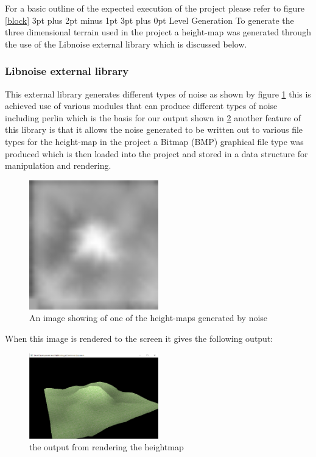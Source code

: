 \documentclass[12pt,a4paper]{article}
\makeatletter
\renewcommand\subsection{\@startsection {subsection}{1}{2mm} %
                               {3pt plus 2pt minus 1pt} %
                               {3pt plus 0pt} %
                               {\normalfont\bfseries}}
\makeatother
\begin{document}
For a basic outline of the expected execution of the project please refer to figure \ref{block}
\subsection{Level Generation}
To generate the three dimensional terrain used in the project a height-map was generated through the use of the Libnoise external library which is discussed below.

\subsubsection{Libnoise external library}
This external library generates different types of noise as shown by figure \ref{noise} this is achieved use of various modules that can produce different types of noise including perlin which is the basis for our output shown in \ref{heightmap} another feature of this library is that it allows the noise generated to be written out to various file types for the height-map in the project a Bitmap (BMP) graphical file type was produced which is then loaded into the project and stored in a data structure for manipulation and rendering.\\
\begin{figure}[ht!]
	\includegraphics[width=0.5\textwidth]{images/heightmaptest}
	\caption{An image showing of one of the height-maps generated by noise}	 \label{noise}
\end{figure}

\pagebreak
When this image is rendered to the screen it gives the following output:
\begin{figure}[ht!]
	\includegraphics[width=0.5\textwidth]{images/Heightmap-output}
	\caption{the output from rendering the heightmap} \label{heightmap}
\end{figure} 
\end{document}
